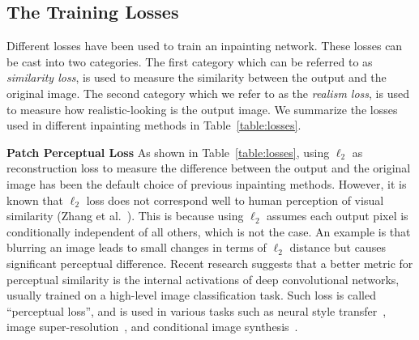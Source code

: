 \subsection{The Training Losses}
Different losses have been used to train an inpainting network. These losses can be cast into two categories. The first category which can be referred to as \textit{similarity loss}, is used to measure the similarity between the output and the original image. The second category which we refer to as the \textit{realism loss}, is used to measure how realistic-looking is the output image. We summarize the losses used in different inpainting methods in Table~\ref{table:losses}. 

\begin{table}[h!]
\begin{center}

  \end{center}
  \caption{Comparison of training losses used in different methods.}
  \vspace{-15pt}
  \label{table:losses}
\end{table}

\noindent\textbf{Patch Perceptual Loss} As shown in Table~\ref{table:losses}, using $\ell_2$ as reconstruction loss to measure the difference between the output and the original image has been the default choice of previous inpainting methods. However, it is known that $\ell_2$ loss does not correspond well to human perception of visual similarity (Zhang et al.~\cite{zhang2018unreasonable}). This is because using $\ell_2$ assumes each output pixel is conditionally independent of all others, which is not the case. An example is that blurring an image leads to small changes in terms of $\ell_2$ distance but causes significant perceptual difference. Recent research suggests that a better metric for perceptual similarity is the internal activations of deep convolutional networks, usually trained on a high-level image classification task. Such loss is called ``perceptual loss'', and is used in various tasks such as neural style transfer~\cite{gatys2016image}, image super-resolution~\cite{johnson2016perceptual}, and conditional image synthesis~\cite{dosovitskiy2016generating,chen2017photographic}.

